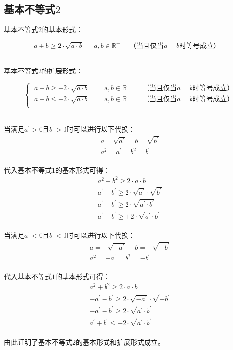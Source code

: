 \documentclass[UTF8]{ctexart}
\begin{document}
\newpage

\subsection{基本不等式$2$}
    基本不等式$2$的基本形式：
    \begin{large}
        \begin{equation*}
            a+b \geq 2\cdot\sqrt{a\cdot b}~~~~~~~a,b\in\mathbb{R^+}~~~~~~\text{（当且仅当$a=b$时等号成立）}
        \end{equation*}
    \end{large}\\
    基本不等式$2$的扩展形式：\vspace{2pt}
    \begin{large}
        \begin{equation*}
            ~~~~
            \begin{cases}
                ~a+b\geq +2\cdot\sqrt{a\cdot b}~~~~~~~~~~a,b\in\mathbb{R^+}~~~~~~~~\text{（当且仅当$a=b$时等号成立）}\\[1mm]
                ~a+b\leq -2\cdot\sqrt{a\cdot b}~~~~~~~~~~a,b\in\mathbb{R^-}~~~~~~~~\text{（当且仅当$a=b$时等号成立）}\\[1mm]
            \end{cases}
        \end{equation*}
    \end{large}\\[2mm]
    当满足$a^{'}>0$且$b^{'}>0$时可以进行以下代换：
    \setcounter{equation}{0}
    \begin{align}
        &a=\sqrt{a^{'}}~~~~~~b=\sqrt{b^{'}}\\[2mm]
        &a^2=a^{'}~~~~~~b^2=b^{'}
    \end{align}\\
    代入基本不等式$1$的基本形式可得：
    \begin{align}
        &a^2+b^2\geq 2\cdot a\cdot b\\[3mm]
        &a^{'}+b^{'}\geq 2\cdot\sqrt{a^{'}}\cdot\sqrt{b^{'}}\\[3mm]
        &a^{'}+b^{'}\geq 2\cdot\sqrt{a^{'}\cdot b^{'}}\\[3mm]
        &a^{'}+b^{'}\geq +2\cdot\sqrt{a^{'}\cdot b^{'}}
    \end{align}\\
    当满足$a^{'}<0$且$b^{'}<0$时可以进行以下代换：
    \begin{align}
        &a=-\sqrt{-a^{'}}~~~~~~b=-\sqrt{-b^{'}}\\[2mm]
        &a^2=-a^{'}~~~~~~b^2=-b^{'}
    \end{align}\\
    代入基本不等式$1$的基本形式可得：
    \begin{align}
        &a^2+b^2\geq 2\cdot a\cdot b\\[3mm]
        &-a^{'}-b^{'}\geq 2\cdot\sqrt{-a^{'}}\cdot\sqrt{-b^{'}}\\[3mm]
        &-a^{'}-b^{'}\geq 2\cdot\sqrt{a^{'}\cdot b^{'}}\\[3mm]
        &a^{'}+b^{'}\leq -2\cdot\sqrt{a^{'}\cdot b^{'}}
    \end{align}\\
    由此证明了基本不等式$2$的基本形式和扩展形式成立。
\end{document}
